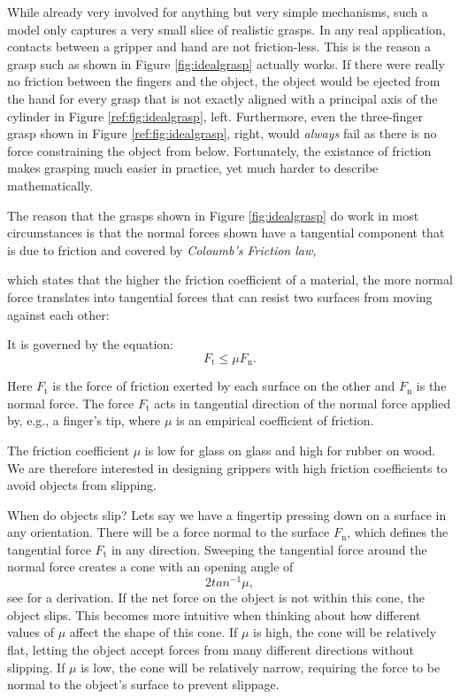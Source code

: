 While already very involved for anything but very simple mechanisms, such a model only captures a very small slice of realistic grasps. In any real application, contacts between a gripper and hand are not friction-less. This is the reason a grasp such as shown in Figure \ref{fig:idealgrasp} actually works. If there were really no friction between the fingers and the object, the object would be ejected from the hand for every grasp that is not exactly aligned with a principal axis of the cylinder in Figure \ref{ref:fig:idealgrasp}, left. Furthermore, even the three-finger grasp shown in  Figure \ref{ref:fig:idealgrasp}, right, would \emph{always} fail as there is no force constraining the object from below. Fortunately, the existance of friction makes grasping much easier in practice, yet much harder to describe mathematically. 

The reason that the grasps shown in Figure \ref{fig:idealgrasp} do work in most circumstances is that the normal forces shown have a tangential component that is due to friction and covered by \emph{Coloumb's Friction law,}

which states that the higher the friction coefficient of a material, the more normal force translates into tangential forces that can resist two surfaces from moving against each other:

It is governed by the equation:
\begin{equation}
F_\mathrm{t} \leq \mu F_\mathrm{n}.
\end{equation}

Here $F_\mathrm{t}$  is the force of friction exerted by each surface on the other and $F_\mathrm{n}$ is the normal force. The force $F_\mathrm{t}$ acts in tangential direction of the normal force applied by, e.g., a finger's tip, where $\mu$ is an empirical coefficient of friction.

The friction coefficient $\mu$ is low for glass on glass and high for rubber on wood.  We are therefore interested in designing grippers with high friction coefficients to avoid objects from slipping.

When do objects slip? Lets say we have a fingertip pressing down on a surface in any orientation. There will be a force normal to the surface $F_\mathrm{n}$, which defines the tangential force $F_\mathrm{t}$ in any direction. Sweeping the tangential force around the normal force creates a cone with an opening angle of 
\begin{equation}
2tan^{-1}\mu,
\end{equation}
see \cite[p. 57]{rimon2019mechanics} for a derivation.
If the net force on the object is not within this cone, the object slips.  This becomes more intuitive when thinking about how different values of $\mu$ affect the shape of this cone. If $\mu$ is high, the cone will be relatively flat, letting the object accept forces from many different directions without slipping. If $\mu$ is low, the cone will be relatively narrow, requiring the force to be normal to the object's surface to prevent slippage.

